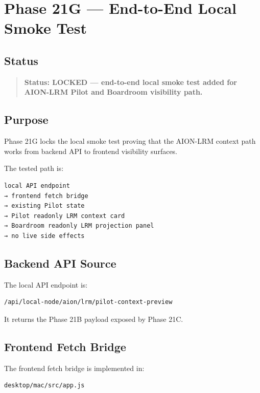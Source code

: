 \section{Phase 21G --- End-to-End Local Smoke Test}
\label{sec:phase21g-lrm-pilot-boardroom-e2e-smoke-lock}

\subsection{Status}

\begin{quote}
\textbf{Status: LOCKED --- end-to-end local smoke test added for AION-LRM Pilot and Boardroom visibility path.}
\end{quote}

\subsection{Purpose}

Phase 21G locks the local smoke test proving that the AION-LRM context path works from backend API to frontend visibility surfaces.

The tested path is:

\begin{verbatim}
local API endpoint
→ frontend fetch bridge
→ existing Pilot state
→ Pilot readonly LRM context card
→ Boardroom readonly LRM projection panel
→ no live side effects
\end{verbatim}

\subsection{Backend API Source}

The local API endpoint is:

\begin{verbatim}
/api/local-node/aion/lrm/pilot-context-preview
\end{verbatim}

It returns the Phase 21B payload exposed by Phase 21C.

\subsection{Frontend Fetch Bridge}

The frontend fetch bridge is implemented in:

\begin{verbatim}
desktop/mac/src/app.js
\end{verbatim}

